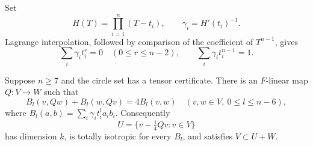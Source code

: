 Set
\begin{equation}\label{eq:barycentric}
 H(T)=\prod_{i=1}^n(T-t_i),\qquad \gamma_i=H'(t_i)^{-1}.
\end{equation}
Lagrange interpolation, followed by comparison of the coefficient of
$T^{n-1}$, gives
\begin{equation}\label{eq:moments}
 \sum_i\gamma_i t_i^r=0\quad(0\le r\le n-2),\qquad
 \sum_i\gamma_i t_i^{n-1}=1.
\end{equation}

\begin{proposition}\label{prop:graph}
Suppose $n\ge7$ and the circle set has a tensor certificate. There is
an $F$-linear map $Q:V\to W$ such that
\begin{equation}\label{eq:graph-relation}
 B_l(v,Qw)+B_l(w,Qv)=4B_l(v,w)
 \quad(v,w\in V,\ 0\le l\le n-6),
\end{equation}
where $B_l(a,b)=\sum_i\gamma_i t_i^l a_ib_i$.
Consequently
\begin{equation}\label{eq:graph-U}
 U=\{v-\tfrac14Qv:v\in V\}
\end{equation}
has dimension $k$, is totally isotropic for every $B_l$, and satisfies
$V\subset U+W$.
\end{proposition}
